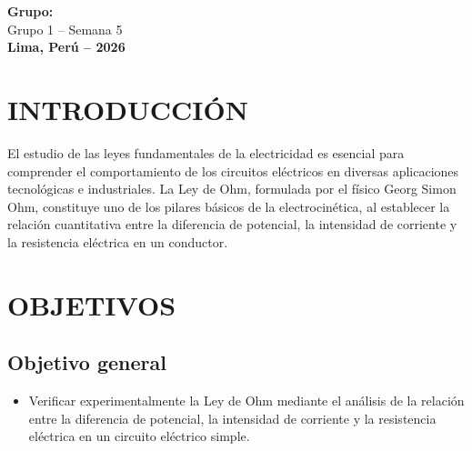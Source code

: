 \documentclass[12pt,a4paper]{article}
\begin{document}
\begin{titlepage}
{\color{rojo}\Large\textbf{Grupo:}}\\
\vspace{0.30cm}
{\color{goldford}\Large Grupo 1 -- Semana 5}\\

\vfill
{\color{goldford}\Large\textbf{Lima, Perú -- 2026}}
\end{titlepage}

\tableofcontents
\newpage


\section{INTRODUCCIÓN}
El estudio de las leyes fundamentales de la electricidad es esencial para comprender el comportamiento de los circuitos eléctricos en diversas aplicaciones tecnológicas e industriales. La Ley de Ohm, formulada por el físico Georg Simon Ohm, constituye uno de los pilares básicos de la electrocinética, al establecer la relación cuantitativa entre la diferencia de potencial, la intensidad de corriente y la resistencia eléctrica en un conductor.

\section{OBJETIVOS}

\subsection{Objetivo general}
\begin{itemize}
    \item Verificar experimentalmente la Ley de Ohm mediante el análisis de la relación entre la diferencia de potencial, la intensidad de corriente y la resistencia eléctrica en un circuito eléctrico simple.
\end{itemize}
\end{document}

